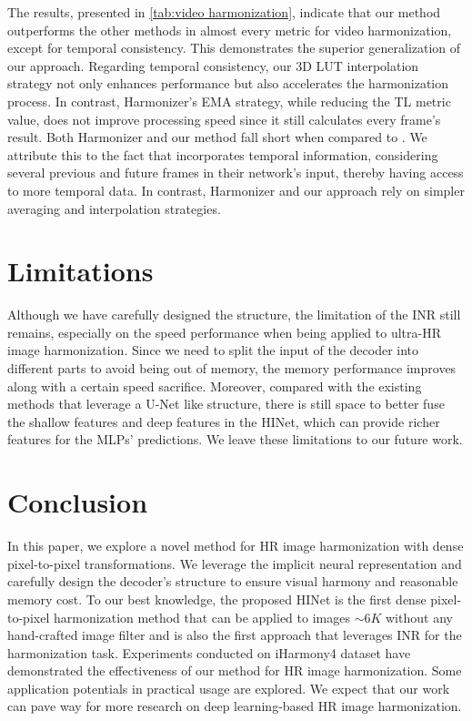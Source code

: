 \documentclass[10pt,journal,twocolumn,twoside]{IEEEtran}
\begin{document}
The results, presented in \cref{tab:video harmonization}, indicate that our method outperforms the other methods in almost every metric for video harmonization, except for temporal consistency. This demonstrates the superior generalization of our approach. Regarding temporal consistency, our 3D LUT interpolation strategy not only enhances performance but also accelerates the harmonization process. In contrast, Harmonizer's EMA strategy, while reducing the TL metric value, does not improve processing speed since it still calculates every frame's result. Both Harmonizer and our method fall short when compared to \cite{hyoutube2021}. We attribute this to the fact that \cite{hyoutube2021} incorporates temporal information, considering several previous and future frames in their network's input, thereby having access to more temporal data. In contrast, Harmonizer and our approach rely on simpler averaging and interpolation strategies.



\section{Limitations}
\label{sec:Limitations}

Although we have carefully designed the structure, the limitation of the INR still remains, especially on the speed performance when being applied to ultra-HR image harmonization. Since we need to split the input of the decoder into different parts to avoid being out of memory, the memory performance improves along with a certain speed sacrifice. Moreover, compared with the existing methods that leverage a U-Net like structure, there is still space to better fuse the shallow features and deep features in the HINet, which can provide richer features for the MLPs' predictions. We leave these limitations to our future work.


\section{Conclusion}
\label{sec:conclusion}

In this paper, we explore a novel method for HR image harmonization with dense pixel-to-pixel transformations. We leverage the implicit neural representation and carefully design the decoder's structure to ensure visual harmony and reasonable memory cost. To our best knowledge, the proposed HINet is the first dense pixel-to-pixel harmonization method that can be applied to images $\sim6K$ without any hand-crafted image filter and is also the first approach that leverages INR for the harmonization task. Experiments conducted on iHarmony4 dataset have demonstrated the effectiveness of our method for HR image harmonization. Some application potentials in practical usage are explored. We expect that our work can pave way for more research on deep learning-based HR image harmonization.





\normalem
  

\end{document}
